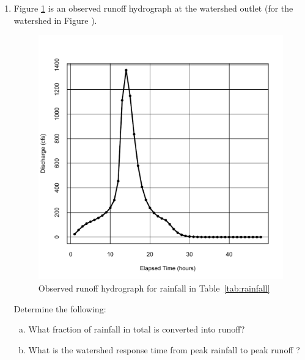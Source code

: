 \documentclass[12pt]{article}
\begin{document}
\begin{enumerate}
\clearpage
\item Figure \ref{fig:hydrograph.jpg} is an observed runoff hydrograph at the watershed outlet (for the watershed in Figure ).  
  \begin{figure}[h!] %
   \centering
   \includegraphics[width=5.5in]{hydrograph.pdf} 
   \caption{Observed runoff hydrograph for rainfall in Table~\ref{tab:rainfall} }
   \label{fig:hydrograph.jpg}
\end{figure}

Determine the following:

\begin{enumerate}[(a)]
\item What fraction of rainfall in total is converted into runoff?
\item What is the watershed response time from peak rainfall to peak runoff ?
\end{enumerate}

%


\end{enumerate}
\end{document}
